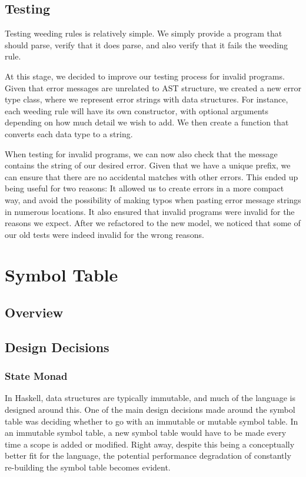 \documentclass[11pt]{article}
\begin{document}
\subsection{Testing}

Testing weeding rules is relatively simple.
We simply provide a program that should parse, verify that it does parse,
and also verify that it fails the weeding rule.

At this stage, we decided to improve our testing process for invalid programs.
Given that error messages are unrelated to AST structure, we created a new error type class, where we represent error strings with data structures.
For instance, each weeding rule will have its own constructor, with optional arguments depending on how much detail we wish to add.
We then create a function that converts each data type to a string.

When testing for invalid programs, we can now also check that the message contains the string of our desired error.
Given that we have a unique prefix, we can ensure that there are no accidental matches with other errors.
This ended up being useful for two reasons: It allowed us to create errors in a more compact way, and avoid the possibility of making typos when pasting error message strings in numerous locations.
It also ensured that invalid programs were invalid for the reasons we expect.
After we refactored to the new model, we noticed that some of our old tests were indeed invalid for the wrong reasons.

\section{Symbol Table}
\subsection{Overview}
\subsection{Design Decisions}

\subsubsection{State Monad}
In Haskell, data structures are typically immutable, and much of the
language is designed around this. One of the main design decisions
made around the symbol table was deciding whether to go with an
immutable or mutable symbol table. In an immutable symbol table, a new
symbol table would have to be made every time a scope is added or
modified. Right away, despite this being a conceptually better fit for
the language, the potential performance degradation of constantly
re-building the symbol table becomes evident.
\end{document}
